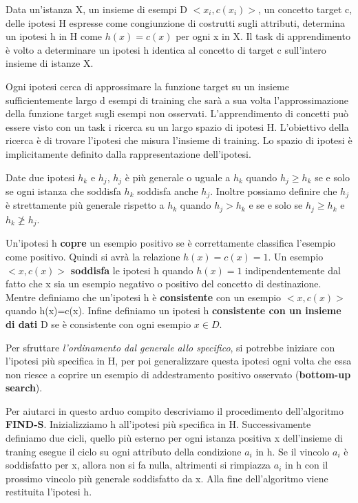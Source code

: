 \documentclass[a4paper]{extarticle}
\begin{document}
\begin{center}
Data un'istanza X, un insieme di esempi D $<x_i,c(x_i)>$, un concetto target c, delle ipotesi H espresse come congiunzione di costrutti sugli attributi, determina un ipotesi h in H come $h(x)=c(x)$ per ogni x in X. Il task di apprendimento è volto a determinare un ipotesi h identica al concetto di target c sull'intero insieme di istanze X.
\end{center}

Ogni ipotesi cerca di approssimare la funzione target su un insieme sufficientemente largo d esempi di training che sarà a sua volta l'approssimazione della funzione target sugli esempi non osservati. L'apprendimento di concetti può essere visto con un task i ricerca su un largo spazio di ipotesi H. L'obiettivo della ricerca è di trovare l'ipotesi che misura l'insieme di training. Lo spazio di ipotesi è implicitamente definito dalla rappresentazione dell'ipotesi.

Date due ipotesi $h_k$ e $h_j$, $h_j$ è più generale o uguale a $h_k$ quando $h_j \geq h_k$ se e solo se ogni istanza che soddisfa $h_k$ soddisfa anche $h_j$. Inoltre possiamo definire che $h_j$ è strettamente più generale rispetto a $h_k$ quando $h_j > h_k$ e se e solo se $h_j \geq h_k$ e $h_k \not \geq h_j$.

Un'ipotesi h \textbf{copre} un esempio positivo se è correttamente classifica l'esempio come positivo. Quindi si avrà la relazione $h(x) = c(x) = 1$. Un esempio $<x,c(x)>$ \textbf{soddisfa} le ipotesi h quando $h(x) = 1$ indipendentemente dal fatto che x sia un esempio negativo o positivo del concetto di destinazione. Mentre definiamo che un'ipotesi h è \textbf{consistente} con un esempio $<x,c(x)>$ quando h(x)=c(x). Infine definiamo un ipotesi h \textbf{consistente con un insieme di dati} D se è consistente con ogni esempio $x \in D$.

Per sfruttare \textit{l'ordinamento dal generale allo specifico}, si potrebbe iniziare con l'ipotesi più specifica in H, per poi generalizzare questa ipotesi ogni volta che essa non riesce a coprire un esempio di addestramento positivo osservato (\textbf{bottom-up search}).

Per aiutarci in questo arduo compito descriviamo il procedimento dell'algoritmo \textbf{FIND-S}. Inizializziamo h all'ipotesi più specifica in H. Successivamente definiamo due cicli, quello più esterno per ogni istanza positiva x dell'insieme di traning esegue il ciclo su ogni attributo della condizione $a_i$ in h. Se il vincolo $a_i$ è soddisfatto per x, allora non si fa nulla, altrimenti si rimpiazza $a_i$ in h con il prossimo vincolo più generale soddisfatto da x. Alla fine dell'algoritmo viene restituita l'ipotesi h.
\end{document}

